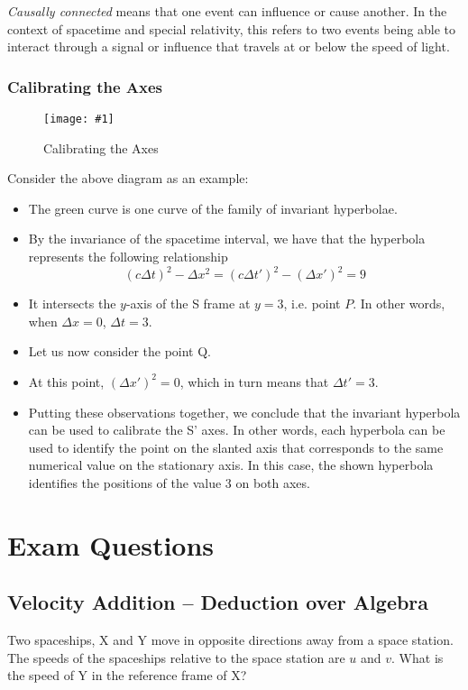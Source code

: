 \documentclass[a4paper,12pt]{article}
\let\oldsection\section
\renewcommand\section{\clearpage\oldsection}
\newcommand{\img}[4]{\begin{center}
  \begin{figure}[H]
    \centering
    \texttt{[image: \#1]}
    \caption{#3}
    \label{fig:#4}
  \end{figure}
\end{center}}
\begin{document}
\textit{Causally connected} means that one event can influence or cause another. In the context of spacetime and special relativity, this refers to two events being able to interact through a signal or influence that travels at or below the speed of light.

\subsubsection{Calibrating the Axes}

\img{calibrate.png}{0.6}{Calibrating the Axes}{calibrate}

Consider the above diagram as an example:
\begin{itemize}
  \item The green curve is one curve of the family of invariant hyperbolae.
  \item By the invariance of the spacetime interval, we have that the hyperbola represents the following relationship
        $$(c\Delta t)^2 - \Delta x^2 = (c\Delta t')^2 - (\Delta x')^2 = 9$$
  \item It intersects the $y$-axis of the S frame at $y = 3$, i.e. point $P$. In other words, when $\Delta x = 0$, $\Delta t = 3$.
  \item Let us now consider the point Q.
  \item At this point, $(\Delta x')^2 = 0$, which in turn means that $\Delta t' = 3$.
  \item Putting these observations together, we conclude that the invariant hyperbola can be used to calibrate the S' axes. In other words, each hyperbola can be used to identify the point on the slanted axis that corresponds to the same numerical value on the stationary axis. In this case, the shown hyperbola identifies the positions of the value 3 on both axes.
\end{itemize}

\pagebreak

\section{Exam Questions}

\subsection{Velocity Addition -- Deduction over Algebra}

Two spaceships, X and Y move in opposite directions away from a space station. The speeds of the spaceships relative to the space station are $u$ and $v$. What is the speed of Y in the reference frame of X?
\end{document}
